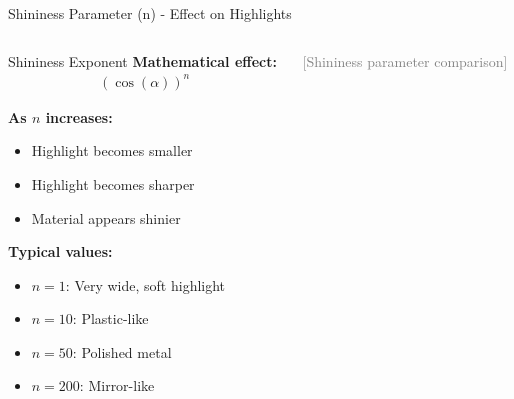 \begin{frame}{Shininess Parameter (n) - Effect on Highlights}
  \begin{columns}
    \begin{column}{0.5\textwidth}
      \begin{mathbox}{Shininess Exponent}
        \textbf{Mathematical effect:}
        \begin{align}
          (\cos(\alpha))^n
        \end{align}

        \textbf{As $n$ increases:}
        \begin{itemize}
          \item Highlight becomes smaller
          \item Highlight becomes sharper
          \item Material appears shinier
        \end{itemize}

        \vspace{0.3cm}
        \textbf{Typical values:}
        \begin{itemize}
          \item $n = 1$: Very wide, soft highlight
          \item $n = 10$: Plastic-like
          \item $n = 50$: Polished metal
          \item $n = 200$: Mirror-like
        \end{itemize}
      \end{mathbox}
    \end{column}
    \begin{column}{0.5\textwidth}
      \vspace{2cm}
      \textcolor{gray}{[Shininess parameter comparison]}

      \vspace{0.3cm}
    \end{column}
  \end{columns}
\end{frame}

